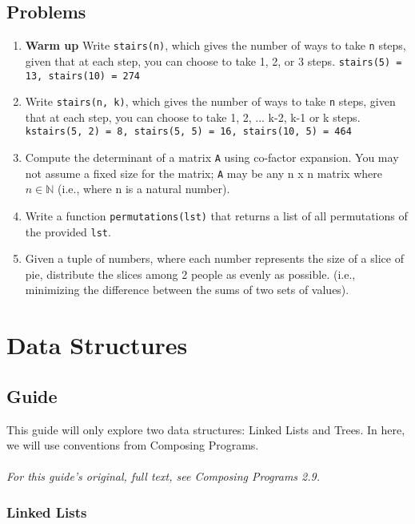 \documentclass[a4paper]{book}
\begin{document}
\newpage \pagebreak

\section{Problems}

\begin{enumerate}
\item \textbf{Warm up} Write {\tt stairs(n)}, which gives the number of ways to take {\tt n} steps, given that at each step, you can choose to take 1, 2, or 3 steps. {\tt stairs(5) = 13, stairs(10) = 274}
\item Write {\tt stairs(n, k)}, which gives the number of ways to take {\tt n} steps, given that at each step, you can choose to take 1, 2, ... k-2, k-1 or k steps. {\tt kstairs(5, 2) = 8, stairs(5, 5) = 16, stairs(10, 5) = 464}
\item Compute the determinant of a matrix {\tt A} using co-factor expansion. You may not assume a fixed size for the matrix; {\tt A} may be any n x n matrix where $n \in \mathbb{N}$ (i.e., where n is a natural number).
\item Write a function {\tt permutations(lst)} that returns a list of all permutations of the provided {\tt lst}.
\item Given a tuple of numbers, where each number represents the size of a slice of pie, distribute the slices among 2 people as evenly as possible. (i.e., minimizing the difference between the sums of two sets of values).
\end{enumerate}

\chapter{Data Structures}

\section{Guide}

This guide will only explore two data structures: Linked Lists and Trees. In here, we will use conventions from Composing Programs.
\\
\\
\textit{For this guide's original, full text, see Composing Programs 2.9.}

\subsection{Linked Lists}
\end{document}
